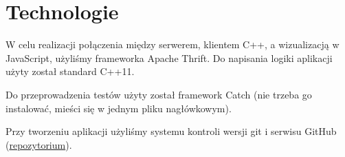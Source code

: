 \chapter{Technologie}
W celu realizacji połączenia między serwerem, klientem C++, a wizualizacją w JavaScript, użyliśmy frameworka Apache Thrift. Do napisania logiki aplikacji użyty został standard C++11.

Do przeprowadzenia testów użyty został framework Catch (nie trzeba go instalować, mieści się w jednym pliku nagłówkowym).

Przy tworzeniu aplikacji użyliśmy systemu kontroli wersji git i serwisu GitHub (\href{https://github.com/kgabryje/Core-Wars-ZPR}{repozytorium}).

